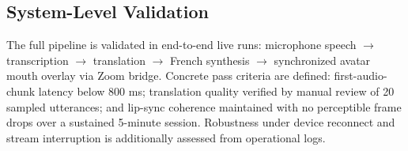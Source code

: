 \subsection{System-Level Validation}

The full pipeline is validated in end-to-end live runs: microphone speech $\rightarrow$ transcription $\rightarrow$ translation $\rightarrow$ French synthesis $\rightarrow$ synchronized avatar mouth overlay via Zoom bridge. Concrete pass criteria are defined: first-audio-chunk latency below 800 ms; translation quality verified by manual review of 20 sampled utterances; and lip-sync coherence maintained with no perceptible frame drops over a sustained 5-minute session. Robustness under device reconnect and stream interruption is additionally assessed from operational logs.